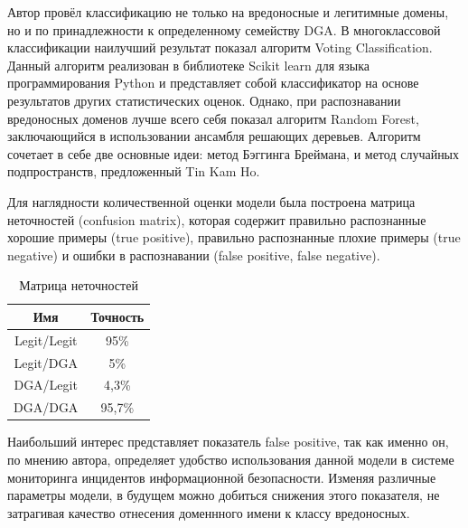     Автор провёл классификацию не только на вредоносные и легитимные домены, но и по принадлежности к определенному семейству DGA. В многоклассовой классификации наилучший результат показал алгоритм Voting Classification. Данный алгоритм реализован в библиотеке Scikit learn для языка программирования Python и представляет собой классификатор на основе результатов других статистических оценок. Однако, при распознавании вредоносных доменов лучше всего себя показал алгоритм Random Forest, заключающийся в использовании ансамбля решающих деревьев. Алгоритм сочетает в себе две основные идеи: метод Бэггинга Бреймана, и метод случайных подпространств, предложенный Tin Kam Ho.

    Для наглядности количественной оценки модели была построена матрица неточностей (confusion matrix), которая содержит правильно распознанные хорошие примеры (true positive), правильно распознанные плохие примеры (true negative) и ошибки в распознавании (false positive, false negative).
    \begin{table}[H]
    \centering
    \caption{Матрица неточностей}\label{}
    \begin{tabular}{@{}cc@{}}
    \toprule
    Имя         & Точность \\ \midrule
    Legit/Legit & 95\%     \\
    Legit/DGA   & 5\%      \\
    DGA/Legit   & 4,3\%    \\
    DGA/DGA     & 95,7\%   \\ \bottomrule
    \end{tabular}
    \end{table}

    Наибольший интерес представляет показатель false positive, так как именно он, по мнению автора, определяет удобство использования данной модели в системе мониторинга инцидентов информационной безопасности. Изменяя различные параметры модели, в будущем можно добиться снижения этого показателя, не затрагивая качество отнесения доменнного имени к классу вредоносных.
    \clearpage
